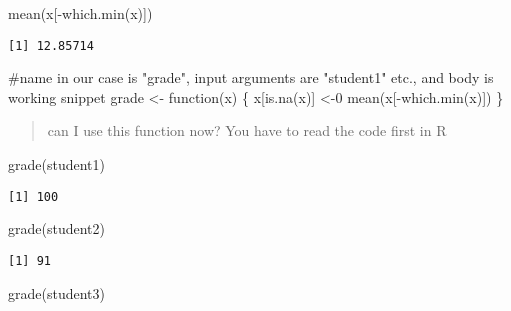 \documentclass[
  letterpaper,
  DIV=11,
  numbers=noendperiod]{scrartcl}
\newenvironment{Shaded}{\begin{snugshade}}{\end{snugshade}}
\newcommand{\CommentTok}[1]{\textcolor[rgb]{0.37,0.37,0.37}{#1}}
\newcommand{\ControlFlowTok}[1]{\textcolor[rgb]{0.00,0.23,0.31}{#1}}
\newcommand{\DecValTok}[1]{\textcolor[rgb]{0.68,0.00,0.00}{#1}}
\newcommand{\FunctionTok}[1]{\textcolor[rgb]{0.28,0.35,0.67}{#1}}
\newcommand{\NormalTok}[1]{\textcolor[rgb]{0.00,0.23,0.31}{#1}}
\newcommand{\OtherTok}[1]{\textcolor[rgb]{0.00,0.23,0.31}{#1}}
\newcommand{\SpecialCharTok}[1]{\textcolor[rgb]{0.37,0.37,0.37}{#1}}
\begin{document}
\begin{Shaded}
\begin{Highlighting}[]
\FunctionTok{mean}\NormalTok{(x[}\SpecialCharTok{{-}}\FunctionTok{which.min}\NormalTok{(x)])}
\end{Highlighting}
\end{Shaded}

\begin{verbatim}
[1] 12.85714
\end{verbatim}

\begin{Shaded}
\begin{Highlighting}[]
\CommentTok{\#name in our case is "grade", input arguments are "student1" etc., and body is working snippet}
\NormalTok{grade }\OtherTok{\textless{}{-}} \ControlFlowTok{function}\NormalTok{(x) \{}
\NormalTok{  x[}\FunctionTok{is.na}\NormalTok{(x)] }\OtherTok{\textless{}{-}}\DecValTok{0}
\FunctionTok{mean}\NormalTok{(x[}\SpecialCharTok{{-}}\FunctionTok{which.min}\NormalTok{(x)])}
\NormalTok{\}}
\end{Highlighting}
\end{Shaded}

\begin{quote}
can I use this function now? You have to read the code first in R
\end{quote}

\begin{Shaded}
\begin{Highlighting}[]
\FunctionTok{grade}\NormalTok{(student1)}
\end{Highlighting}
\end{Shaded}

\begin{verbatim}
[1] 100
\end{verbatim}

\begin{Shaded}
\begin{Highlighting}[]
\FunctionTok{grade}\NormalTok{(student2)}
\end{Highlighting}
\end{Shaded}

\begin{verbatim}
[1] 91
\end{verbatim}

\begin{Shaded}
\begin{Highlighting}[]
\FunctionTok{grade}\NormalTok{(student3)}
\end{Highlighting}
\end{Shaded}
\end{document}
